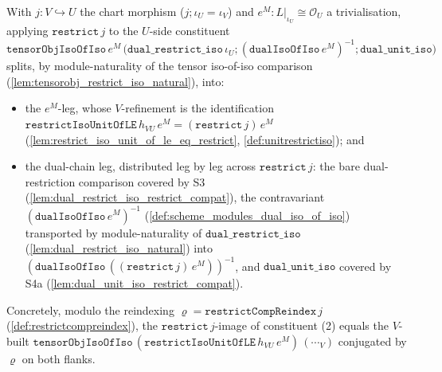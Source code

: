 \begin{lemma}\leanok
  \label{lem:trivialisation_restrict_em_split}
  With \(j : V \hookrightarrow U\) the chart morphism (\(j \mathbin{;} \iota_U = \iota_V\)) and
  \(e^M : L|_{\iota_U} \cong \mathcal{O}_U\) a trivialisation, applying \(\mathtt{restrict}\,j\) to the
  \(U\)-side constituent
  \(\mathtt{tensorObjIsoOfIso}\,e^M\,\bigl(\mathtt{dual\_restrict\_iso}\,\iota_U \mathbin{;}
  (\mathtt{dualIsoOfIso}\,e^M)^{-1} \mathbin{;} \mathtt{dual\_unit\_iso}\bigr)\) splits, by
  module-naturality of the tensor iso-of-iso comparison
  (\cref{lem:tensorobj_restrict_iso_natural}), into:
  \begin{itemize}
    \item the \(e^M\)-leg, whose \(V\)-refinement is the identification
      \(\mathtt{restrictIsoUnitOfLE}\,h_{VU}\,e^M = (\mathtt{restrict}\,j)\,e^M\)
      (\cref{lem:restrict_iso_unit_of_le_eq_restrict}, \cref{def:unitrestrictiso}); and
    \item the dual-chain leg, distributed leg by leg across \(\mathtt{restrict}\,j\): the bare
      dual-restriction comparison covered by S3 (\cref{lem:dual_restrict_iso_restrict_compat}), the
      contravariant \((\mathtt{dualIsoOfIso}\,e^M)^{-1}\) (\cref{def:scheme_modules_dual_iso_of_iso})
      transported by module-naturality of \(\mathtt{dual\_restrict\_iso}\)
      (\cref{lem:dual_restrict_iso_natural}) into \((\mathtt{dualIsoOfIso}\,((\mathtt{restrict}\,j)\,e^M))^{-1}\),
      and \(\mathtt{dual\_unit\_iso}\) covered by S4a (\cref{lem:dual_unit_iso_restrict_compat}).
  \end{itemize}
  Concretely, modulo the reindexing \(\varrho = \mathtt{restrictCompReindex}\,j\)
  (\cref{def:restrictcompreindex}), the \(\mathtt{restrict}\,j\)-image of constituent (2) equals the
  \(V\)-built \(\mathtt{tensorObjIsoOfIso}\,(\mathtt{restrictIsoUnitOfLE}\,h_{VU}\,e^M)\,(\cdots_V)\)
  conjugated by \(\varrho\) on both flanks.
\end{lemma}
